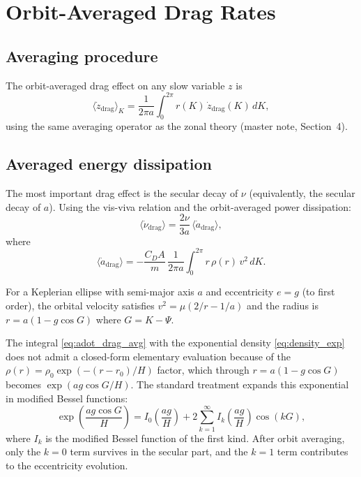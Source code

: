 \documentclass[11pt]{article}
\newcommand{\mean}[1]{\langle #1 \rangle}
\begin{document}
\section{Orbit-Averaged Drag Rates}

\subsection{Averaging procedure}

The orbit-averaged drag effect on any slow variable $z$ is
\begin{equation}
\mean{\dot z_{\mathrm{drag}}}_K
= \frac{1}{2\pi a}\int_0^{2\pi}
r(K)\,\dot z_{\mathrm{drag}}(K)\,dK,
\label{eq:drag_avg}
\end{equation}
using the same averaging operator as the zonal theory (master note,
Section~4).

\subsection{Averaged energy dissipation}

The most important drag effect is the secular decay of $\nu$ (equivalently,
the secular decay of $a$). Using the vis-viva relation and the
orbit-averaged power dissipation:
\begin{equation}
\mean{\dot\nu_{\mathrm{drag}}}
= \frac{2\nu}{3a}\,\mean{\dot a_{\mathrm{drag}}},
\label{eq:nudot_drag_avg}
\end{equation}
where
\begin{equation}
\mean{\dot a_{\mathrm{drag}}}
= -\frac{C_D A}{m}\,\frac{1}{2\pi a}
\int_0^{2\pi} r\,\rho(r)\,v^2\,dK.
\label{eq:adot_drag_avg}
\end{equation}

For a Keplerian ellipse with semi-major axis $a$ and eccentricity $e = g$
(to first order), the orbital velocity satisfies
$v^2 = \mu(2/r - 1/a)$ and the radius is
$r = a(1 - g\cos G)$ where $G = K - \Psi$.

The integral \eqref{eq:adot_drag_avg} with the exponential density
\eqref{eq:density_exp} does not admit a closed-form elementary evaluation
because of the $\rho(r) = \rho_0 \exp(-(r-r_0)/H)$ factor, which through
$r = a(1 - g\cos G)$ becomes $\exp(ag\cos G / H)$. The standard treatment
expands this exponential in modified Bessel functions:
\begin{equation}
\exp\!\left(\frac{ag\cos G}{H}\right)
= I_0\!\left(\frac{ag}{H}\right)
+ 2\sum_{k=1}^{\infty}
I_k\!\left(\frac{ag}{H}\right)\cos(kG),
\label{eq:bessel_expansion}
\end{equation}
where $I_k$ is the modified Bessel function of the first kind. After
orbit averaging, only the $k = 0$ term survives in the secular part, and the
$k = 1$ term contributes to the eccentricity evolution.
\end{document}
